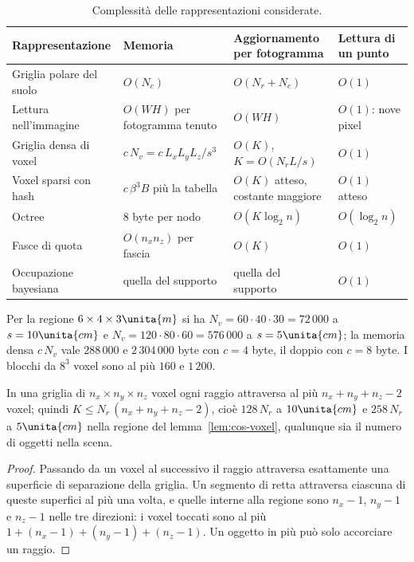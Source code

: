 \begin{table}[H]\centering\small
\caption{Complessità delle rappresentazioni considerate.}\label{tab:cos-complessita}
\begin{tabular}{@{}llll@{}}\toprule
Rappresentazione & Memoria & Aggiornamento per fotogramma & Lettura di un punto\\\midrule
Griglia polare del suolo & $O(N_c)$ & $O(N_r+N_c)$ & $O(1)$\\
Lettura nell'immagine & $O(WH)$ per fotogramma tenuto & $O(WH)$ & $O(1)$: nove pixel\\
Griglia densa di voxel & $c\,N_v=c\,L_xL_yL_z/s^3$ & $O(K)$, $K=O(N_rL/s)$ & $O(1)$\\
Voxel sparsi con hash & $c\,\beta^3B$ più la tabella & $O(K)$ atteso, costante maggiore & $O(1)$ atteso\\
Octree & 8 byte per nodo & $O(K\log_2 n)$ & $O(\log_2 n)$\\
Fasce di quota & $O(n_xn_z)$ per fascia & $O(K)$ & $O(1)$\\
Occupazione bayesiana & quella del supporto & quella del supporto & $O(1)$\\\bottomrule
\end{tabular}
\end{table}

\begin{lemma}\label{lem:cos-voxel}
Per la regione $6\times4\times3\unita{m}$ si ha $N_v=60\cdot40\cdot30=72\,000$ a $s=10\unita{cm}$ e $N_v=120\cdot80\cdot60=576\,000$ a $s=5\unita{cm}$; la memoria densa $c\,N_v$ vale $288\,000$ e $2\,304\,000$ byte con $c=4$ byte, il doppio con $c=8$ byte. I blocchi da $8^3$ voxel sono al più $160$ e $1\,200$. 
\end{lemma}

\begin{lemma}\label{lem:cos-passi}
In una griglia di $n_x\times n_y\times n_z$ voxel ogni raggio attraversa al più $n_x+n_y+n_z-2$ voxel; quindi $K\le N_r\,(n_x+n_y+n_z-2)$, cioè $128\,N_r$ a $10\unita{cm}$ e $258\,N_r$ a $5\unita{cm}$ nella regione del lemma~\ref{lem:cos-voxel}, qualunque sia il numero di oggetti nella scena. 
\end{lemma}
\begin{proof}
Passando da un voxel al successivo il raggio attraversa esattamente una superficie di separazione della griglia. Un segmento di retta attraversa ciascuna di queste superfici al più una volta, e quelle interne alla regione sono $n_x-1$, $n_y-1$ e $n_z-1$ nelle tre direzioni: i voxel toccati sono al più $1+(n_x-1)+(n_y-1)+(n_z-1)$. Un oggetto in più può solo accorciare un raggio.
\end{proof}

